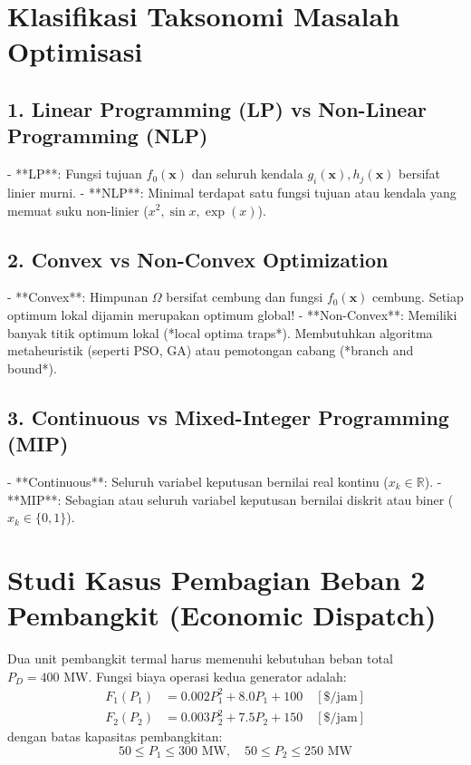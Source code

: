 \documentclass[11pt,a4paper]{article}
\newcommand{\R}{\mathbb{R}}
\begin{document}
\section{Klasifikasi Taksonomi Masalah Optimisasi}

\subsection{1. Linear Programming (LP) vs Non-Linear Programming (NLP)}
- **LP**: Fungsi tujuan $f_0(\mathbf{x})$ dan seluruh kendala $g_i(\mathbf{x}), h_j(\mathbf{x})$ bersifat linier murni.
- **NLP**: Minimal terdapat satu fungsi tujuan atau kendala yang memuat suku non-linier ($x^2, \sin x, \exp(x)$).

\subsection{2. Convex vs Non-Convex Optimization}
- **Convex**: Himpunan $\Omega$ bersifat cembung dan fungsi $f_0(\mathbf{x})$ cembung. Setiap optimum lokal dijamin merupakan optimum global!
- **Non-Convex**: Memiliki banyak titik optimum lokal (*local optima traps*). Membutuhkan algoritma metaheuristik (seperti PSO, GA) atau pemotongan cabang (*branch and bound*).

\subsection{3. Continuous vs Mixed-Integer Programming (MIP)}
- **Continuous**: Seluruh variabel keputusan bernilai real kontinu ($x_k \in \R$).
- **MIP**: Sebagian atau seluruh variabel keputusan bernilai diskrit atau biner ($x_k \in \{0, 1\}$).

\section{Studi Kasus Pembagian Beban 2 Pembangkit (Economic Dispatch)}

Dua unit pembangkit termal harus memenuhi kebutuhan beban total $P_D = 400\text{ MW}$.
Fungsi biaya operasi kedua generator adalah:
\begin{align}
    F_1(P_1) &= 0.002 P_1^2 + 8.0 P_1 + 100 \quad [\text{\$/jam}] \\
    F_2(P_2) &= 0.003 P_2^2 + 7.5 P_2 + 150 \quad [\text{\$/jam}]
\end{align}
dengan batas kapasitas pembangkitan:
\begin{equation}
    50 \le P_1 \le 300\text{ MW}, \quad 50 \le P_2 \le 250\text{ MW}
\end{equation}
\end{document}
